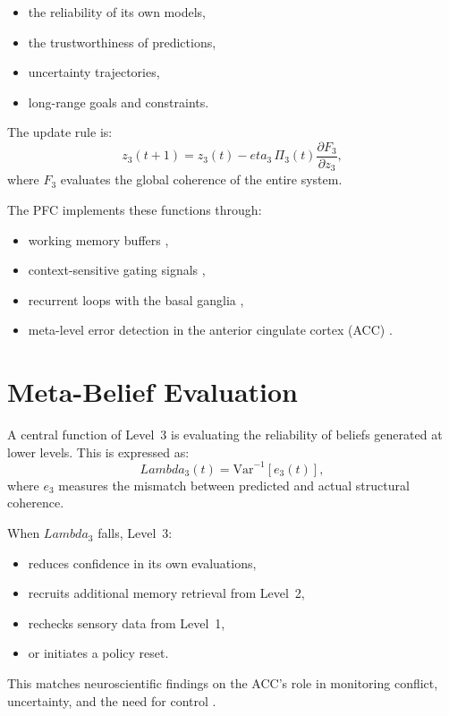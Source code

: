 \documentclass[12pt,oneside]{book}
\theoremstyle{plain}
\theoremstyle{definition}
\let\citep\parencite
\def\eta{eta}%
\def\Lambda{Lambda}%
\begin{document}
\begin{itemize}
  \item the reliability of its own models,
  \item the trustworthiness of predictions,
  \item uncertainty trajectories,
  \item long-range goals and constraints.
\end{itemize}

The update rule is:
\[
z_3(t+1)
=
z_3(t)
-\eta_3 \, \Pi_3(t)
\frac{\partial F_3}{\partial z_3},
\]
where $F_3$ evaluates the global coherence of the entire system.

The PFC implements these functions through:

\begin{itemize}
  \item working memory buffers \citep{baddeley2003working},
  \item context-sensitive gating signals \citep{herculano2013pfc},
  \item recurrent loops with the basal ganglia \citep{frank2005dynamic},
  \item meta-level error detection in the anterior cingulate cortex (ACC)
    \citep{botvinick2001conflict}.
\end{itemize}

\section{Meta-Belief Evaluation}

A central function of Level~3 is evaluating the reliability of beliefs
generated at lower levels. This is expressed as:
\[
\Lambda_3(t)
= \text{Var}^{-1}\!\left[ e_{3}(t) \right],
\]
where $e_{3}$ measures the mismatch between predicted and actual structural
coherence.

When $\Lambda_3$ falls, Level~3:

\begin{itemize}
  \item reduces confidence in its own evaluations,
  \item recruits additional memory retrieval from Level~2,
  \item rechecks sensory data from Level~1,
  \item or initiates a policy reset.
\end{itemize}

This matches neuroscientific findings on the ACC’s role in monitoring
conflict, uncertainty, and the need for control
\citep{holroyd2002error,eisenberger2015pain}.
\end{document}

